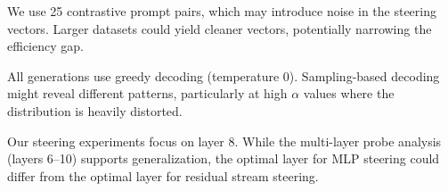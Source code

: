 We use 25 contrastive prompt pairs, which may introduce noise in the steering vectors. Larger datasets could yield cleaner vectors, potentially narrowing the efficiency gap.

All generations use greedy decoding (temperature 0). Sampling-based decoding might reveal different patterns, particularly at high $\alpha$ values where the distribution is heavily distorted.

Our steering experiments focus on layer 8. While the multi-layer probe analysis (layers 6--10) supports generalization, the optimal layer for MLP steering could differ from the optimal layer for residual stream steering.
